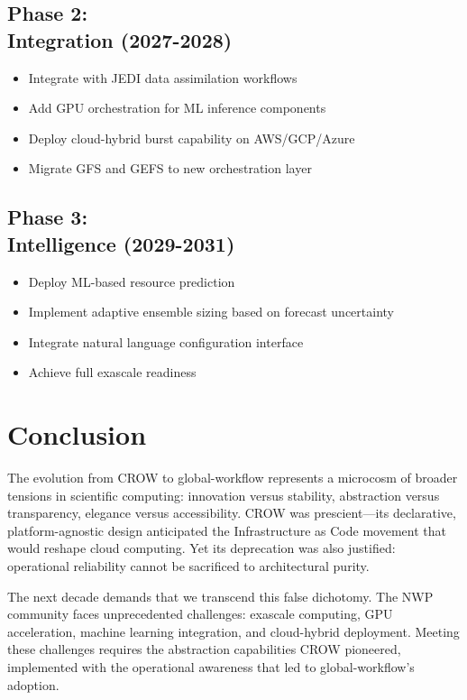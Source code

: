 \documentclass[11pt,twocolumn]{article}
\begin{document}
\subsection{Phase 2:\\ Integration (2027-2028)}
\begin{itemize}
    \item Integrate with JEDI data assimilation workflows
    \item Add GPU orchestration for ML inference components
    \item Deploy cloud-hybrid burst capability on AWS/GCP/Azure
    \item Migrate GFS and GEFS to new orchestration layer
\end{itemize}

\subsection{Phase 3:\\ Intelligence (2029-2031)}
\begin{itemize}
    \item Deploy ML-based resource prediction
    \item Implement adaptive ensemble sizing based on forecast uncertainty
    \item Integrate natural language configuration interface
    \item Achieve full exascale readiness
\end{itemize}

\section{Conclusion}

The evolution from CROW to global-workflow represents a microcosm of broader tensions in scientific computing: innovation versus stability, abstraction versus transparency, elegance versus accessibility. CROW was prescient---its declarative, platform-agnostic design anticipated the Infrastructure as Code movement that would reshape cloud computing. Yet its deprecation was also justified: operational reliability cannot be sacrificed to architectural purity.

The next decade demands that we transcend this false dichotomy. The NWP community faces unprecedented challenges: exascale computing, GPU acceleration, machine learning integration, and cloud-hybrid deployment. Meeting these challenges requires the abstraction capabilities CROW pioneered, implemented with the operational awareness that led to global-workflow's adoption.
\end{document}
